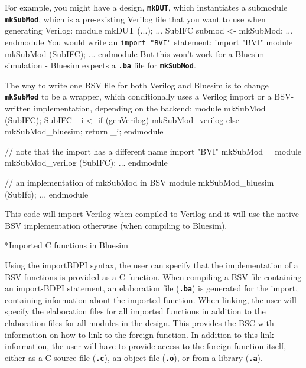 \documentclass{article}
\makeatletter
\newcommand{\te}[1]{\texttt{#1}}
\newenvironment{centerboxverbatim}
  {\center
   \boxedverbatim}
  {\endboxedverbatim
  {\endcenter }}
\def\subsubsubsection{\@startsection {subsubsubsection}{4}{\z@}{-3ex plus -1ex minus -.2ex}{1.25ex plus .2ex}{\normalsize\bf}*}
\makeatother
\begin{document}
For example, you might have a design, {\bf\tt mkDUT}, which
instantiates a submodule {\bf\tt mkSubMod}, which is a pre-existing
Verilog  file that you want to use when generating Verilog:
\begin{centerboxverbatim}
module mkDUT (...);
   ...
   SubIFC submod <- mkSubMod;
   ...
endmodule
\end{centerboxverbatim}
You would write an \te{import "BVI"} statement:
\begin{centerboxverbatim}
  import "BVI" module mkSubMod (SubIFC); ... endmodule
\end{centerboxverbatim}
But this won't work for a Bluesim simulation - Bluesim
expects a {\bf\tt .ba} file for {\bf\tt mkSubMod}.

The way to write one BSV file for both Verilog and Bluesim is to
change {\bf\tt mkSubMod} to be a wrapper, which conditionally uses a
Verilog  import or a BSV-written implementation, depending on the backend:
\begin{centerboxverbatim}
module mkSubMod (SubIFC);
   SubIFC _i <- if (genVerilog)
                   mkSubMod_verilog
                else
                   mkSubMod_bluesim;
   return _i;
endmodule

// note that the import has a different name
import "BVI" mkSubMod =
    module mkSubMod_verilog (SubIFC); ... endmodule

// an implementation of mkSubMod in BSV
module mkSubMod_bluesim (SubIfc);
   ...
endmodule
\end{centerboxverbatim}

This code will import Verilog when compiled to Verilog and
it will  use the native BSV implementation otherwise (when compiling
to Bluesim).


\subsubsubsection{Imported C functions in Bluesim}
\label{importC-bluesim}

Using the importBDPI syntax, the user can specify that the
implementation of a BSV functions is provided as a C function.
When compiling a BSV file
containing an import-BDPI statement, an elaboration file ({\bf\tt .ba}) is
generated for the import, containing information about the imported
function.  When linking, the user will specify the elaboration files
for all  imported functions in addition to the
elaboration files for all modules in the design.
This provides the BSC with  information  on
how to  link
to the foreign function.  In addition to this link information, the
user will have to provide access to the foreign function itself,
either as a C source file ({\bf\tt .c}), an object file ({\bf\tt .o}), or from
a library ({\bf\tt .a}).
\end{document}

